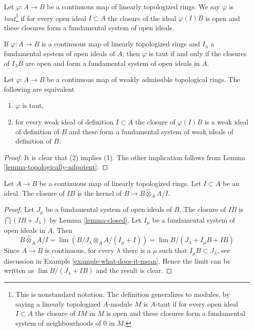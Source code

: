 \begin{definition}
\label{definition-taut}
Let $\varphi : A \to B$ be a continuous map of linearly topologized rings.
We say $\varphi$ is {\it taut}\footnote{This is nonstandard notation.
The definition generalizes to modules, by saying a linearly topologized
$A$-module $M$ is $A$-taut if for every open ideal $I \subset A$ the closure
of $IM$ in $M$ is open and these closures form a fundamental system of
neighbourhoods of $0$ in $M$.}
if for every open ideal $I \subset A$ the closure of the ideal $\varphi(I)B$
is open and these closures form a fundamental system of open ideals.
\end{definition}

\noindent
If $\varphi : A \to B$ is a continuous map of linearly topologized rings
and $I_\lambda$ a fundamental system of open ideals of $A$, then $\varphi$
is taut if and only if
the closures of $I_\lambda B$ are open and form a fundamental
system of open ideals in $A$.

\begin{lemma}
\label{lemma-taut-weakly-admissible}
Let $\varphi : A \to B$ be a continuous map of weakly admissible topological
rings. The following are equivalent
\begin{enumerate}
\item $\varphi$ is taut,
\item for every weak ideal of definition $I \subset A$ the closure of
$\varphi(I)B$ is a weak ideal of definition of $B$ and these form a
fundamental system of weak ideals of definition of $B$.
\end{enumerate}
\end{lemma}

\begin{proof}
It is clear that (2) implies (1). The other implication follows
from Lemma \ref{lemma-topologically-nilpotent}.
\end{proof}

\begin{lemma}
\label{lemma-closure-image-ideal}
Let $A \to B$ be a continuous map of linearly topologized rings.
Let $I \subset A$ be an ideal. The closure of $IB$
is the kernel of $B \to B \widehat{\otimes}_A A/I$.
\end{lemma}

\begin{proof}
Let $J_\mu$ be a fundamental system of open ideals of $B$.
The closure of $IB$ is $\bigcap (IB + J_\lambda)$ by Lemma \ref{lemma-closed}.
Let $I_\mu$ be a fundamental system of open ideals in $A$.
Then
$$
B \widehat{\otimes}_A A/I = \lim (B/J_\lambda \otimes_A A/(I_\mu + I)) =
\lim B/(J_\lambda + I_\mu B + I B)
$$
Since $A \to B$ is continuous, for every $\lambda$ there
is a $\mu$ such that $I_\mu B \subset J_\lambda$, see discussion in
Example \ref{example-what-does-it-mean}. Hence the limit
can be written as $\lim B/(J_\lambda + IB)$ and the result is clear.
\end{proof}

